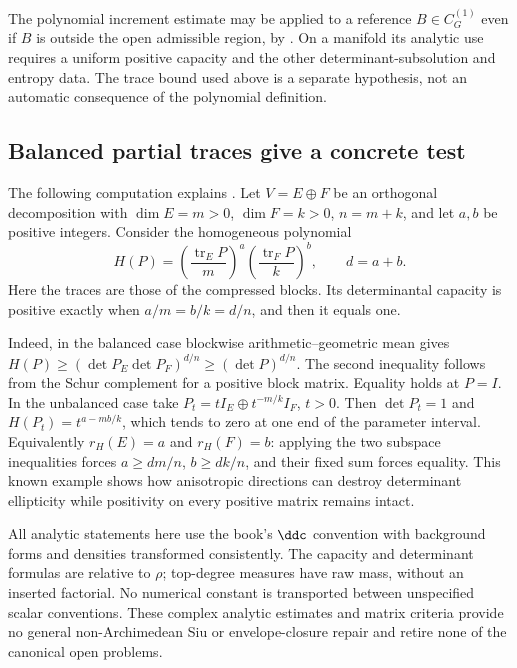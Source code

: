 The polynomial increment estimate may be applied to a reference
$B\in C_G^{(1)}$ even if $B$ is outside the open admissible
region, by \cite[Corollary~4.14]{FangMaWu26DeterminantalV1}.
On a manifold its analytic use requires a uniform positive
capacity and the other determinant-subsolution and entropy data.
The trace bound used above is a separate hypothesis, not an
automatic consequence of the polynomial definition.

\subsection{Balanced partial traces give a concrete test}
\label{sec:ytd-determinantal-partial-traces}

The following computation explains
\cite[Example~5.19]{FangMaWu26DeterminantalV1}.
Let $V=E\oplus F$ be an orthogonal decomposition with
$\dim E=m>0$, $\dim F=k>0$, $n=m+k$, and let $a,b$ be
positive integers. Consider the homogeneous polynomial
\[
\tag{68.23cm}\label{eq:ytd-balanced-partial-traces}
 H(P)=\left(\frac{\operatorname{tr}_E P}{m}\right)^a
       \left(\frac{\operatorname{tr}_F P}{k}\right)^b,
 \qquad d=a+b.
\]
Here the traces are those of the compressed blocks.
Its determinantal capacity is positive exactly when
$a/m=b/k=d/n$, and then it equals one.

Indeed, in the balanced case blockwise arithmetic--geometric
mean gives
$H(P)\geq(\det P_E\det P_F)^{d/n}\geq(\det P)^{d/n}$.
The second inequality follows from the Schur complement for a
positive block matrix. Equality holds at $P=I$.
In the unbalanced case take
$P_t=tI_E\oplus t^{-m/k}I_F$, $t>0$.
Then $\det P_t=1$ and $H(P_t)=t^{a-mb/k}$, which tends to
zero at one end of the parameter interval.
Equivalently $r_H(E)=a$ and $r_H(F)=b$: applying the two
subspace inequalities forces $a\geq dm/n$, $b\geq dk/n$,
and their fixed sum forces equality. This known example shows
how anisotropic directions can destroy determinant ellipticity
while positivity on every positive matrix remains intact.

All analytic statements here use the book's $\ddc$ convention
with background forms and densities transformed consistently.
The capacity and determinant formulas are relative to $\rho$;
top-degree measures have raw mass, without an inserted factorial.
No numerical constant is transported between unspecified scalar
conventions. These complex analytic estimates and matrix
criteria provide no general non-Archimedean Siu or envelope-closure
repair and retire none of the canonical open problems.

